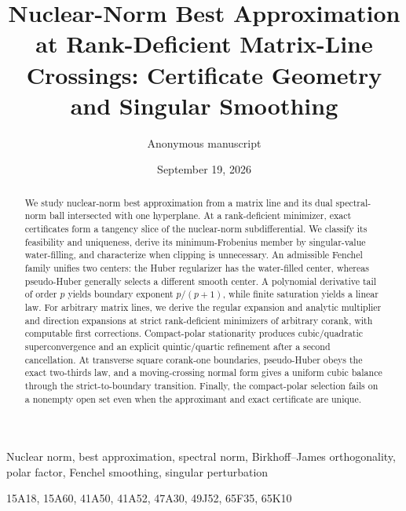 \documentclass[10pt]{article}
\title{Nuclear-Norm Best Approximation at Rank-Deficient Matrix-Line Crossings:
Certificate Geometry and Singular Smoothing}
\author{Anonymous manuscript}
\date{September 19, 2026}
\begin{document}
\maketitle

\begin{abstract}
We study nuclear-norm best approximation from a matrix line and its dual
spectral-norm ball intersected with one hyperplane.  At a rank-deficient
minimizer, exact certificates form a tangency slice of the nuclear-norm
subdifferential.  We classify its feasibility and uniqueness, derive its
minimum-Frobenius member by singular-value water-filling, and characterize
when clipping is unnecessary.  An admissible Fenchel family unifies two
centers: the Huber regularizer has the water-filled center, whereas
pseudo-Huber generally selects a different smooth center.  A polynomial
derivative tail of order \(p\) yields boundary exponent \(p/(p+1)\), while
finite saturation yields a linear law.  For arbitrary matrix lines, we derive
the regular expansion and analytic multiplier and direction expansions at
strict rank-deficient minimizers of arbitrary corank, with computable first
corrections.  Compact-polar stationarity produces cubic/quadratic
superconvergence and an explicit quintic/quartic refinement after a second
cancellation.  At transverse square corank-one boundaries, pseudo-Huber obeys
the exact two-thirds law, and a moving-crossing normal form gives a uniform
cubic balance through the strict-to-boundary transition.  Finally, the
compact-polar selection fails on a nonempty open set even when the approximant
and exact certificate are unique.
\end{abstract}

\begin{keywords}
Nuclear norm, best approximation, spectral norm, Birkhoff--James
orthogonality, polar factor, Fenchel smoothing, singular perturbation
\end{keywords}
\begin{MSCcodes}
15A18, 15A60, 41A50, 41A52, 47A30, 49J52, 65F35, 65K10
\end{MSCcodes}









\ifdefined\SSOReview

\else

\fi

\end{document}
